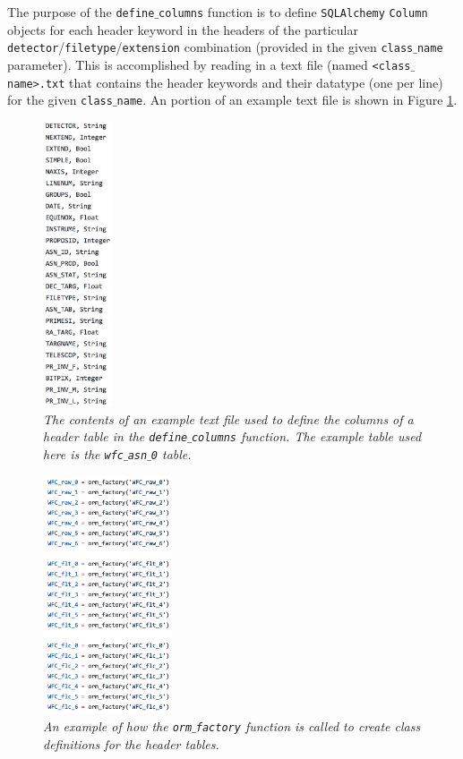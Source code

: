 \documentclass[10pt,journal,compsoc]{IEEEtran}
\begin{document}
The purpose of the \texttt{define$\_$columns} function is to define \texttt{SQLAlchemy} \texttt{Column} objects for each header keyword in the headers of the particular
\texttt{detector}/\texttt{filetype}/\texttt{extension} combination (provided in the given \texttt{class$\_$name} parameter).  This is accomplished by reading in a text file
(named \texttt{<class$\_$name>.txt} that contains the header keywords and their datatype (one per line) for the given \texttt{class$\_$name}. An portion of an example text file
is shown in Figure \ref{fig17}.

\begin{figure}[!h]
\centering
\includegraphics[width=0.8in]{./figures/table_definition.png}
\caption{\textit{The contents of an example text file used to define the columns of a header table in the \texttt{define$\_$columns} function. The example table used here is
the \texttt{wfc$\_$asn$\_$0} table.}}
\label{fig17}
\end{figure}

\begin{figure}[!h]
\centering
\includegraphics[width=1.5in]{./figures/orm_factory_calls.png}
\caption{\textit{An example of how the \texttt{orm$\_$factory} function is called to create class definitions for the header tables.}}
\label{fig18}
\end{figure}
\end{document}
